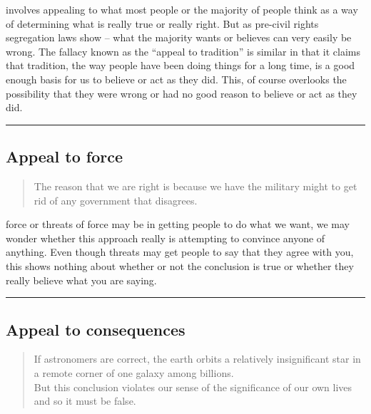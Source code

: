 \documentclass[justified]{tufte-book}
\newenvironment{argument}{\begin{quote}\normalsize}{\end{quote}}
\begin{document}
 involves appealing to what most people or the majority of people think as a way of determining what is really true or really right. But as pre-civil rights segregation laws show -- what the majority wants or believes can very easily be wrong. The fallacy known as the ``appeal to tradition'' is similar in that it claims that tradition, the way people have been doing things for a long time, is a good enough basis for us to believe or act as they did. This, of course overlooks the possibility that they were wrong or had no good reason to believe or act as they did.

\begin{center}\rule{0.5\linewidth}{\linethickness}\end{center}

\hypertarget{appeal-to-force}{%
\subsection*{Appeal to force}\label{appeal-to-force}}

\begin{argument}
The reason that we are right is because we have the military might to
get rid of any government that disagrees.
\end{argument}

 force or threats of force may be in getting people to do what we want, we may wonder whether this approach really is attempting to convince anyone of anything. Even though threats may get people to say that they agree with you, this shows nothing about whether or not the conclusion is true or whether they really believe what you are saying.

\begin{center}\rule{0.5\linewidth}{\linethickness}\end{center}

\hypertarget{appeal-to-consequences}{%
\subsection*{Appeal to consequences}\label{appeal-to-consequences}}

\begin{argument}
If astronomers are correct, the earth orbits a relatively insignificant
star in a remote corner of one galaxy among billions.\\
But this conclusion violates our sense of the significance of our own
lives and so it must be false.
\end{argument}
\end{document}
